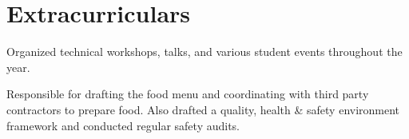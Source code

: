 \section{Extracurriculars}
\vspace{5pt}


{Organized technical workshops, talks, and various student events throughout the year.}

\vspace{5pt}

{Responsible for drafting the food menu and coordinating with third party contractors to prepare food.
    Also drafted a quality, health \& safety environment framework and conducted regular safety audits.}

\vspace{5pt}
